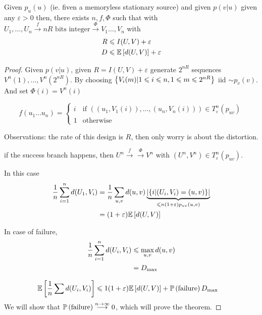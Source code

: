 \begin{theorem}
    Given $p_u(u)$ (ie. fiven a memoryless stationary source) and given $p(v\vert u)$ given any $\varepsilon > 0$ then, there exists $n,f,\Phi$ such that with $U_1,\ldots,U_n \overset{f}{\to} nR \text{ bits integer} \overset{\Phi}{\to} V_1\ldots,V_n$ with
    \[
        \begin{aligned}
            R &\leqslant I(U,V) + \varepsilon\\
            D &\leqslant \mathbb{E}\left[ d(U,V) \right] + \varepsilon
        \end{aligned}    
    \]
\end{theorem}
\begin{proof}
    Given $p(v\vert u)$, given $R = I(U,V) + \varepsilon$ generate $2^{nR}$ sequences $V^n(1),\ldots, V^n(2^{nR})$. By choosing $\left\{  V_i(m) \vert 1\leqslant i \leqslant n, 1\leqslant m \leqslant 2^{nR} \right\}$ iid $\sim p_v(v)$. And set $\Phi(i) = V^n(i)$
    
    \[
        f(u_1\ldots u_n) = \begin{cases}
            i & \text{if } ((u_1, V_1(i)),\ldots, (u_n, V_n(i))) \in T^n_\varepsilon(p_{uv})\\
            1 & \text{otherwise}
        \end{cases}
    \]
    
    Observations: the rate of this design is $R$, then only worry is about the distortion.
    
    if the success branch happens, then $U^n \overset{f}{\to} \overset{\Phi}{\to} V^n$ with $(U^n,V^n) \in T_\varepsilon^n(p_{uv})$.
    
    In this case 
    \[
        \begin{aligned}
            \frac{1}{n} \sum\limits_{i=1}^n d(U_1, V_i) &= \frac{1}{n} \sum_{u,v} d(u,v) \underbrace{\left\lvert\left\{ i\vert (U_i, V_i) = (u,v) \right\}\right\rvert}_{\leqslant n(1+\varepsilon)p_{uv}(u,v)}\\
            &= (1+\varepsilon)\mathbb{E}\left[ d(U,V) \right]
        \end{aligned}
    \]
    
    In case of failure,
    \[
        \begin{aligned}
            \frac{1}{n} \sum\limits_{i=1}^n d(U_i, V_i) &\leqslant \max\limits_{u,v} d(u,v)\\
            &= D_{\max}
        \end{aligned}
    \]
    
    \[
        \begin{aligned}
            \mathbb{E}\left[ \frac{1}{n}\sum d(U_i, V_i) \right] &\leqslant 1(1+\varepsilon) \mathbb{E}\left[ d(U,V) \right]+\mathbb{P}\left( \text{failure} \right) D_{\max}
        \end{aligned}    
    \]
    We will show that $\mathbb{P}\left( \text{failure} \right) \overset{n\to\infty}{\longrightarrow} 0 $, which will prove the theorem.
    

\end{proof}
